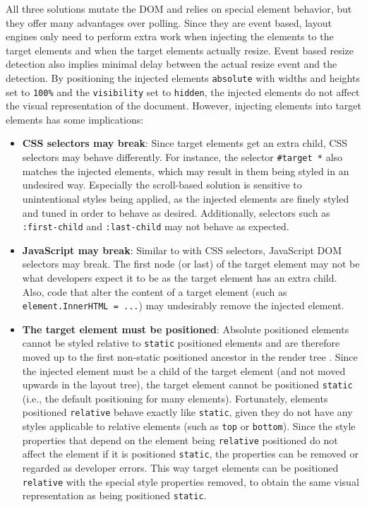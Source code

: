 \documentclass[a4paper,11pt]{kth-mag}
\newcommand{\code}[1]{\texttt{#1}}
\begin{document}
        All three solutions mutate the \gls{DOM} and relies on special \gls{element} behavior, but they offer many advantages over polling.
        Since they are event based, \glspl{layout engine} only need to perform extra work when injecting the \glspl{element} to the target \glspl{element} and when the target \glspl{element} actually resize.
        Event based resize detection also implies minimal delay between the actual resize event and the detection.
        By positioning the injected \glspl{element} \code{absolute} with widths and heights set to \code{100\%} and the \code{visibility} set to \code{hidden}, the injected \glspl{element} do not affect the visual representation of the \gls{document}.
        However, injecting \glspl{element} into target \glspl{element} has some implications:
        \begin{itemize}
          \item \textbf{\gls{CSS} selectors may break}:
            Since target \glspl{element} get an extra child, \gls{CSS} selectors may behave differently.
            For instance, the selector \code{\#target~*} also matches the injected \glspl{element}, which may result in them being styled in an undesired way.
            Especially the scroll-based solution is sensitive to unintentional styles being applied, as the injected \glspl{element} are finely styled and tuned in order to behave as desired.
            Additionally, selectors such as \code{:first-child} and \code{:last-child} may not behave as expected.
          \item \textbf{\gls{JavaScript} may break}:
            Similar to with \gls{CSS} selectors, \gls{JavaScript} \gls{DOM} selectors may break.
            The first node (or last) of the target \gls{element} may not be what developers expect it to be as the target element has an extra child.
            Also, code that alter the content of a target \gls{element} (such as \code{element.InnerHTML = ...}) may undesirably remove the injected \gls{element}.
          \item \textbf{The target \gls{element} must be positioned}:
            Absolute positioned \glspl{element} cannot be styled relative to \code{static} positioned \glspl{element} and are therefore moved up to the first non-static positioned ancestor in the render tree \cite{w3c_visuren}.
            Since the injected element must be a child of the target \gls{element} (and not moved upwards in the layout tree), the target \gls{element} cannot be positioned \code{static} (i.e., the default positioning for many \glspl{element}).
            Fortunately, \glspl{element} positioned \code{relative} behave exactly like \code{static}, given they do not have any styles applicable to relative \glspl{element} (such as \code{top} or \code{bottom}).
            Since the style properties that depend on the \gls{element} being \code{relative} positioned do not affect the \gls{element} if it is positioned \code{static}, the properties can be removed or regarded as developer errors.
            This way target \glspl{element} can be positioned \code{relative} with the special style properties removed, to obtain the same visual representation as being positioned \code{static}.
        \end{itemize}
\end{document}
